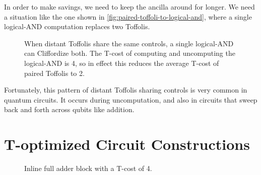 \documentclass[twocolumn,longbibliography]{quantumarticle-customized}
\begin{document}
In order to make savings, we need to keep the ancilla around for longer.
We need a situation like the one shown in \autoref{fig:paired-toffoli-to-logical-and}, where a single logical-AND computation replaces two Toffolis.

\begin{figure}
  \caption{
	When distant Toffolis share the same controls, a single logical-AND can Cliffordize both.
    The T-cost of computing and uncomputing the logical-AND is 4, so in effect this reduces the average T-cost of paired Toffolis to 2.
  }
  \label{fig:paired-toffoli-to-logical-and}
\end{figure}

Fortunately, this pattern of distant Toffolis sharing controls is very common in quantum circuits.
It occurs during uncomputation, and also in circuits that sweep back and forth across qubits like addition.


\section{T-optimized Circuit Constructions}
\label{sec:circuit-constructions}


\begin{figure}
  \caption{
	Inline full adder block with a T-cost of 4.
  }
  \label{fig:addition}
\end{figure}
\end{document}
